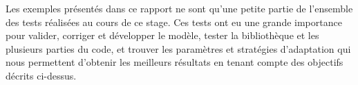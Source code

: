 \indent Les exemples présentés dans ce rapport ne sont qu'une petite partie de l'ensemble des tests réalisées au cours de ce stage. Ces tests ont eu une grande importance pour valider, corriger et développer le modèle, tester la bibliothèque et les plusieurs parties du code, et trouver les paramètres et stratégies d'adaptation qui nous permettent d'obtenir les meilleurs résultats en tenant compte des objectifs décrits ci-dessus.